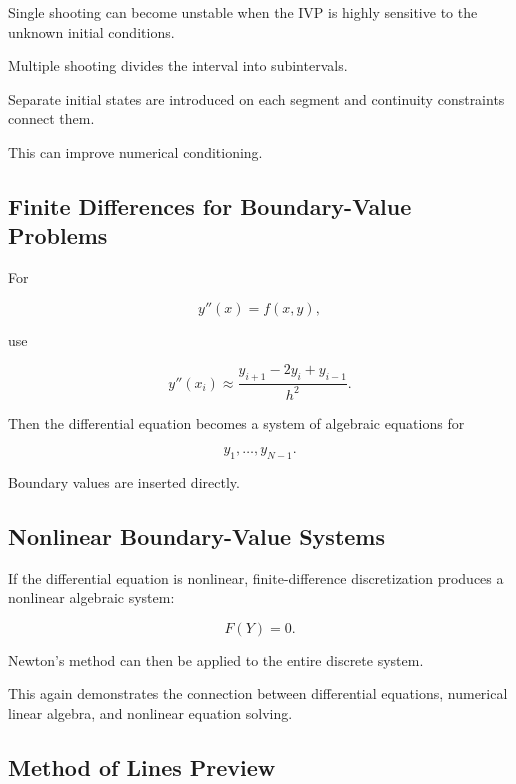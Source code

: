 Single shooting can become unstable when the IVP is highly sensitive to
the unknown initial conditions.

Multiple shooting divides the interval into subintervals.

Separate initial states are introduced on each segment and continuity
constraints connect them.

This can improve numerical conditioning.

\subsection{Finite Differences for Boundary-Value Problems}
\label{subsec:ode-bvp-finite-differences}

For

\[
y''(x)=f(x,y),
\]

use

\[
\boxed{
y''(x_i)
\approx
\frac{
y_{i+1}-2y_i+y_{i-1}
}{
h^2
}.
}
\]

Then the differential equation becomes a system of algebraic equations for

\[
y_1,\ldots,y_{N-1}.
\]

Boundary values are inserted directly.

\subsection{Nonlinear Boundary-Value Systems}
\label{subsec:nonlinear-bvp-systems}

If the differential equation is nonlinear, finite-difference
discretization produces a nonlinear algebraic system:

\[
\boxed{
F(Y)=0.
}
\]

Newton's method can then be applied to the entire discrete system.

This again demonstrates the connection between differential equations,
numerical linear algebra, and nonlinear equation solving.

\subsection{Method of Lines Preview}
\label{subsec:method-of-lines-preview}

